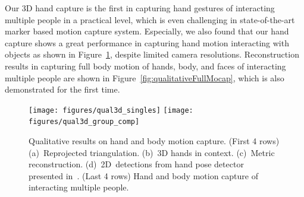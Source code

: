 Our 3D hand capture is the first in capturing hand gestures of interacting multiple people in a practical level, which is even challenging in state-of-the-art marker based motion capture system. Especially, we also found that our hand capture shows a great performance in capturing hand motion interacting with objects as shown in Figure~\ref{fig:qualitativeHandCaptureGroup}, despite limited camera resolutions.  Reconstruction results in capturing full body motion of hands, body, and faces of interacting multiple people are shown in Figure~\ref{fig:qualitativeFullMocap}, which is also demonstrated for the first time. 

\begin{figure}[h]
	\centering
	\texttt{[image: figures/qual3d\_singles]}
	\texttt{[image: figures/qual3d\_group\_comp]}
	\caption{Qualitative results on hand and body motion capture. (First 4 rows) (a)~Reprojected triangulation. (b)~3D hands in context. (c)~Metric reconstruction. (d)~2D~detections from hand pose detector presented in~\cite{Tomas-17}. (Last 4 rows) Hand and body motion capture of interacting multiple people.}
	\label{fig:qualitativeHandCaptureGroup}
\end{figure}
\vfill

